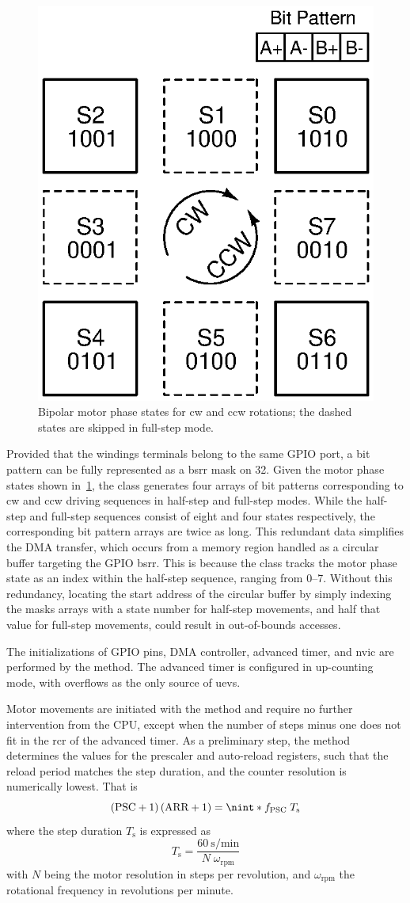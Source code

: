 \begin{figure}
    \centering
    \includegraphics[width=.35\linewidth]{../gfx/Translator_states.eps}
    \caption{Bipolar motor phase states for \acs{cw} and \acs{ccw} rotations; the dashed states are skipped in full-step mode.}
    \label{fig:bsteps}
\end{figure}

Provided that the windings terminals belong to the same GPIO port, a bit pattern can be fully represented as a \ac{bsrr} mask on \qty{32}{\bit}. Given the motor phase states shown in~\cref{fig:bsteps}, the  class generates four arrays of bit patterns corresponding to \ac{cw} and \ac{ccw} driving sequences in half-step and full-step modes.
While the half-step and full-step sequences consist of eight and four states respectively, the corresponding bit pattern arrays are twice as long. This redundant data simplifies the DMA transfer, which occurs from a memory region handled as a circular buffer targeting the GPIO \ac{bsrr}. This is because the  class tracks the motor phase state as an index within the half-step sequence, ranging from \numrange{0}{7}. Without this redundancy, locating the start address of the circular buffer by simply indexing the masks arrays with a state number for half-step movements, and half that value for full-step movements, could result in out-of-bounds accesses.

The initializations of GPIO pins, DMA controller, advanced timer, and \ac{nvic} are performed by the  method. The advanced timer is configured in up-counting mode, with overflows as the only source of \acp{uev}.

Motor movements are initiated with the  method and require no further intervention from the CPU, except when the number of steps minus one does not fit in the \ac{rcr} of the advanced timer.
As a preliminary step, the  method determines the values for the prescaler and auto-reload registers, such that the reload period matches the step duration, and the counter resolution is numerically lowest. That is
\[
    \pqty*{\text{PSC}+1}\,\pqty*{\text{ARR}+1} = \nint*{{f_\text{PSC}}\;T_\text{s}}
\]
where the step duration $T_\text{s}$ is expressed as
\[
    T_\text{s} = \frac{\qty{60}{\s\per\minute}}{N\;\omega_\text{rpm}}
\]
with $N$ being the motor resolution in steps per revolution, and $\omega_{\text{rpm}}$ the rotational frequency in revolutions per minute.

